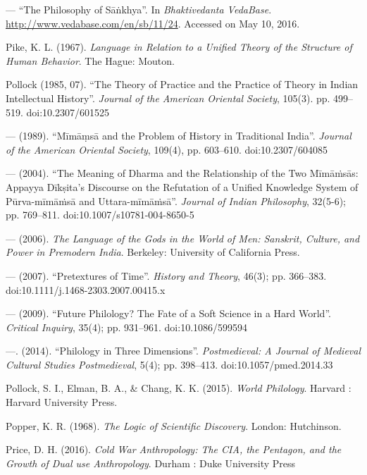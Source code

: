 \begin{thebibliography}{99}
--- ``The Philosophy of Sāṅkhya''. In {\sl Bhaktivedanta VedaBase}. \url{http://www.vedabase.com/en/sb/11/24}. Accessed on May 10, 2016.


Pike, K. L. (1967). {\sl Language in Relation to a Unified Theory of the Structure of Human Behavior}. The Hague: Mouton.

Pollock (1985, 07). ``The Theory of Practice and the Practice of Theory in Indian Intellectual History''. {\sl Journal of the American Oriental Society}, 105(3). pp. 499--519. doi:10.2307/601525

--- (1989). ``Mīmāṃsā and the Problem of History in Traditional India''. {\sl Journal of the American Oriental Society}, 109(4), pp. 603--610. doi:10.2307/604085

--- (2004). ``The Meaning of Dharma and the Relationship of the Two Mīmāṁsās: Appayya Dīkṣita's Discourse on the Refutation of a Unified Knowledge System of Pūrva-mīmāṁsā and Uttara-mīmāṁsā''. {\sl Journal of Indian Philosophy}, 32(5-6); pp. 769--811. doi:10.1007/s10781-004-8650-5

--- (2006). {\sl The Language of the Gods in the World of Men: Sanskrit, Culture, and Power in Premodern India}. Berkeley: University of California Press.

--- (2007). ``Pretextures of Time''. {\sl History and Theory}, 46(3); pp. 366--383. doi:10.1111/j.1468-2303.2007.00415.x

--- (2009). ``Future Philology? The Fate of a Soft Science in a Hard World''. {\sl Critical Inquiry}, 35(4); pp. 931--961. doi:10.1086/599594

---. (2014). ``Philology in Three Dimensions''. {\sl Postmedieval: A Journal of Medieval Cultural Studies Postmedieval}, 5(4); pp. 398--413. doi:10.1057/pmed.2014.33

Pollock, S. I., Elman, B. A., \& Chang, K. K. (2015). {\sl World Philology}. Harvard : Harvard University Press.

Popper, K. R. (1968). {\sl The Logic of Scientific Discovery}. London: Hutchinson.

Price, D. H. (2016). {\sl Cold War Anthropology: The CIA, the Pentagon, and the Growth of Dual use Anthropology}. Durham : Duke University Press


\end{thebibliography}
